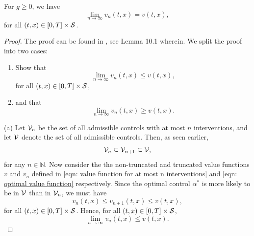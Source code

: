 \begin{lemma}
\label{lemma: Lemma 10.1 in ØS}
    For $g \geq 0$, we have
    \begin{equation*}
        \lim_{n \rightarrow \infty} v_n(t,x) = v(t,x),
    \end{equation*}
    for all $(t,x) \in [0,T] \times \mathcal{S}$.
\end{lemma}
\begin{proof}
    The proof can be found in \cite{oksendal2007applied}, see Lemma 10.1 wherein. We split the proof into two cases:
    \begin{enumerate}[label=(\alph*)]
        \item Show that 
        \begin{equation*}
            \lim_{n \rightarrow \infty} v_n(t,x) \leq v(t,x),
        \end{equation*}
        for all $(t,x) \in [0,T] \times \mathcal{S}$,
        \item and that 
        \begin{equation*}
            \lim_{n \rightarrow \infty} v_n(t,x) \geq v(t,x).
        \end{equation*}
    \end{enumerate}
    
    (a) Let $\mathcal{V}_n$ be the set of all admissible controls with at most $n$ interventions, and let $\mathcal{V}$ denote the set of all admissible controls. Then, as seen earlier,
    \begin{equation*}
        \mathcal{V}_n \subseteq \mathcal{V}_{n+1} \subseteq \mathcal{V},
    \end{equation*}
    for any $n \in \mathbb N$. Now consider the the non-truncated and truncated value functions $v$ and $v_n$ defined in \eqref{eqn: value function for at most n interventions} and \eqref{eqn: optimal value function} respectively. Since the optimal control $\alpha^*$ is more likely to be in $\mathcal{V}$ than in $\mathcal{V}_n$, we must have 
    \begin{equation*}
        v_n(t,x) \leq v_{n+1}(t,x) \leq v(t,x),
    \end{equation*}
    for all $(t,x) \in [0,T] \times \mathcal{S}$. Hence, for all $(t,x) \in [0,T] \times \mathcal{S}$,
    \begin{equation*}
        \lim_{n \rightarrow \infty} v_n(t,x) \leq v(t,x).
    \end{equation*}


\end{proof}
